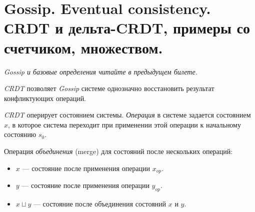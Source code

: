 \section{Gossip. Eventual consistency. СRDT и дельта-CRDT, примеры со счетчиком, множеством.}

\textit{Gossip и базовые определения читайте в предыдущем билете.}

\begin{remark}
    \textit{CRDT} позволяет \textit{Gossip} системе однозначно восстановить
    результат конфликтующих операций.
\end{remark}

\begin{definition}
    \textit{CRDT} оперирует состоянием системы.
    \textit{Операция} в системе задается состоянием $x$,
    в которое система переходит при применении этой операции
    к начальному состоянию $s_0$.
\end{definition}

\begin{definition}
    Операция \textit{объединения} (merge) для состояний
    после нескольких операций:
    \begin{itemize}
        \item $x$ --- состояние после применения операции $x_{op}$.
        \item $y$ --- состояние после применения операции $y_{op}$.
        \item $x \sqcup y$ --- состояние после объединения состояний $x$ и $y$.
    \end{itemize}
\end{definition}

